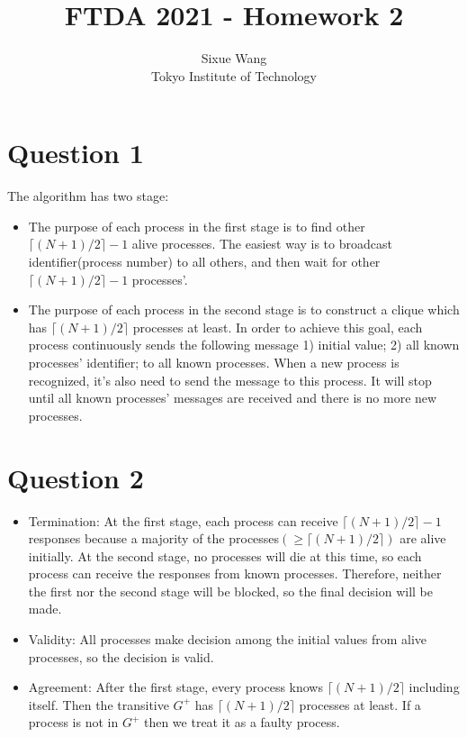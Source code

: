 \documentclass{article}
\title{FTDA 2021 - Homework 2}
\author{Sixue Wang\\Tokyo Institute of Technology}
\begin{document}
\maketitle

\section*{Question 1}
The algorithm has two stage:
\begin{itemize}
  \item The purpose of each process in the first stage is to find other $\lceil (N+1)/2 \rceil - 1$ alive processes. The easiest way is to broadcast identifier(process number) to all others, and then wait for other $\lceil (N+1)/2 \rceil - 1$ processes'.
  \item The purpose of each process in the second stage is to construct a clique which has $\lceil (N+1)/2 \rceil$ processes at least. In order to achieve this goal, each process continuously sends the following message 1) initial value; 2) all known processes' identifier; to all known processes. When a new process is recognized, it's also need to send the message to this process. It will stop until all known processes' messages are received and there is no more new processes.
\end{itemize}

\section*{Question 2}
\begin{itemize}
  \item Termination: At the first stage, each process can receive $\lceil (N+1)/2 \rceil - 1$ responses because a majority of the processes$(\geq \lceil (N+1)/2 \rceil)$ are alive initially. At the second stage, no processes will die at this time, so each process can receive the responses from known processes. Therefore, neither the first nor the second stage will be blocked, so the final decision will be made.
  \item Validity: All processes make decision among the initial values from alive processes, so the decision is valid.
  \item Agreement: After the first stage, every process knows $\lceil (N+1)/2 \rceil$ including itself. Then the transitive $G^+$ has $\lceil (N+1)/2 \rceil$ processes at least. If a process is not in $G^+$ then we treat it as a faulty process.
\end{itemize}
\end{document}
